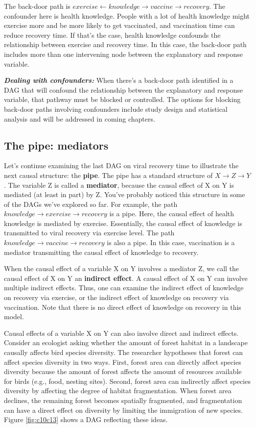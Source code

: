\documentclass[
]{book}
\begin{document}
The back-door path is \(exercise \gets knowledge \to vaccine \to recovery\). The confounder here is health knowledge. People with a lot of health knowledge might exercise more and be more likely to get vaccinated, and vaccination time can reduce recovery time. If that's the case, health knowledge confounds the relationship between exercise and recovery time. In this case, the back-door path includes more than one intervening node between the explanatory and response variable.

\textbf{\emph{Dealing with confounders:}} When there's a back-door path identified in a DAG that will confound the relationship between the explanatory and response variable, that pathway must be blocked or controlled. The options for blocking back-door paths involving confounders include study design and statistical analysis and will be addressed in coming chapters.

\subsection{The pipe: mediators}\label{the-pipe-mediators}

Let's continue examining the last DAG on viral recovery time to illustrate the next causal structure: the \textbf{pipe}. The pipe has a standard structure of \(X \to Z \to Y\). The variable Z is called a \textbf{mediator}, because the causal effect of X on Y is mediated (at least in part) by Z. You've probably noticed this structure in some of the DAGs we've explored so far. For example, the path \(knowledge \to exercise \to recovery\) is a pipe. Here, the causal effect of health knowledge is mediated by exercise. Essentially, the causal effect of knowledge is transmitted to viral recovery via exercise level. The path \(knowledge \to vaccine \to recovery\) is also a pipe. In this case, vaccination is a mediator transmitting the causal effect of knowledge to recovery.

When the causal effect of a variable X on Y involves a mediator Z, we call the causal effect of X on Y an \textbf{indirect effect}. A causal effect of X on Y can involve multiple indirect effects. Thus, one can examine the indirect effect of knowledge on recovery via exercise, or the indirect effect of knowledge on recovery via vaccination. Note that there is no direct effect of knowledge on recovery in this model.

Causal effects of a variable X on Y can also involve direct and indirect effects. Consider an ecologist asking whether the amount of forest habitat in a landscape causally affects bird species diversity. The researcher hypotheses that forest can affect species diversity in two ways. First, forest area can directly affect species diversity because the amount of forest affects the amount of resources available for birds (e.g., food, nesting sites). Second, forest area can indirectly affect species diversity by affecting the degree of habitat fragmentation. When forest area declines, the remaining forest becomes spatially fragmented, and fragmentation can have a direct effect on diversity by limiting the immigration of new species. Figure \ref{fig:c10c13} shows a DAG reflecting these ideas.
\end{document}

